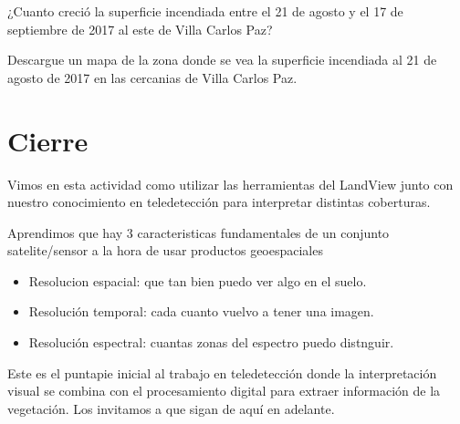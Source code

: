 \documentclass[a4paper,12pt]{book}
\begin{document}
\begin{que}
    ¿Cuanto creció la superficie incendiada entre el 21 de agosto y el 17 de septiembre de 2017 al este de Villa Carlos Paz?
\end{que}

\begin{que}
    Descargue un mapa de la zona donde se vea la superficie incendiada al 21 de agosto de 2017 en las cercanias de Villa Carlos Paz.
\end{que}

\chapter{Cierre}

Vimos en esta actividad como utilizar las herramientas del LandView junto con nuestro conocimiento en teledetección para interpretar distintas coberturas.

Aprendimos que hay 3 caracteristicas fundamentales de un conjunto satelite/sensor a la hora de usar productos geoespaciales

\begin{itemize}
    \item Resolucion espacial: que tan bien puedo ver algo en el suelo.
    \item Resolución temporal: cada cuanto vuelvo a tener una imagen.
    \item Resolución espectral: cuantas zonas del espectro puedo distnguir.
\end{itemize}

Este es el puntapie inicial al trabajo en teledetección donde la interpretación visual se combina con el procesamiento digital para extraer información de la vegetación. Los invitamos a que sigan de aquí en adelante.
\end{document}
